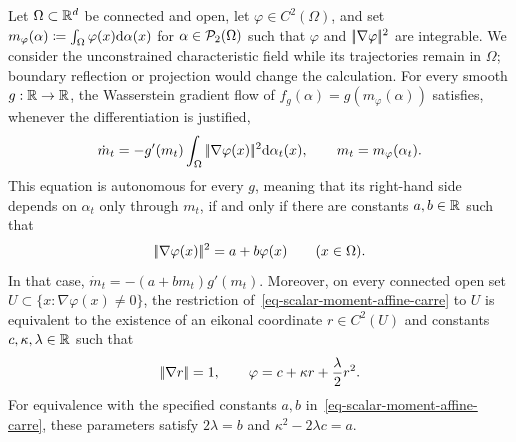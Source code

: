 \begin{prop}\label{prop-scalar-moment-closure}
	Let $\Omega\subset\mathbb{R}^d$ be connected and open, let $\varphi\in C^2(\Omega)$, and set
	\(m_\varphi(\alpha)\coloneqq\int_\Omega\varphi(x)\mathrm{d}\alpha(x)\)
	for $\alpha\in\mathcal{P}_2(\Omega)$ such that $\varphi$ and $|\!| \nabla\varphi |\!|^2$ are integrable. We consider the unconstrained characteristic field while its trajectories remain in $\Omega$; boundary reflection or projection would change the calculation. For every smooth $g:\mathbb{R}\to\mathbb{R}$, the Wasserstein gradient flow of $f_g(\alpha)=g(m_\varphi(\alpha))$ satisfies, whenever the differentiation is justified,
	\[
		\dot m_t
		=
		-g'(m_t)\int_\Omega|\!| \nabla\varphi(x) |\!|^2\mathrm{d}\alpha_t(x),
		\qquad m_t=m_\varphi(\alpha_t).
	\]
	This equation is autonomous for every $g$, meaning that its right-hand side depends on $\alpha_t$ only through $m_t$, if and only if there are constants $a,b\in\mathbb{R}$ such that
	\begin{equation}\label{eq-scalar-moment-affine-carre}
		|\!| \nabla\varphi(x) |\!|^2=a+b\varphi(x)
		\qquad (x\in\Omega).
	\end{equation}
	In that case, $\dot m_t=-(a+b m_t)g'(m_t)$.
	Moreover, on every connected open set $U\subset\{x:\nabla\varphi(x)\neq0\}$, the restriction of~\eqref{eq-scalar-moment-affine-carre} to $U$ is equivalent to the existence of an eikonal coordinate $r\in C^2(U)$ and constants $c,\kappa,\lambda\in\mathbb{R}$ such that
	\begin{equation}\label{eq-scalar-moment-eikonal-form}
		|\!| \nabla r |\!|=1,
		\qquad
		\varphi=c+\kappa r+\frac{\lambda}{2}r^2.
	\end{equation}
	For equivalence with the specified constants $a,b$ in~\eqref{eq-scalar-moment-affine-carre}, these parameters satisfy $2\lambda=b$ and $\kappa^2-2\lambda c=a$.
\end{prop}

